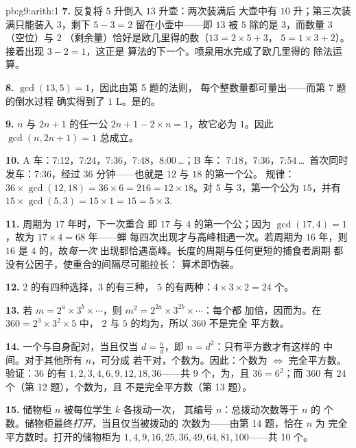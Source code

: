 \begin{solution}{pb:g9:arith:1}
\textbf{7.} 反复将 $5$ 升倒入 $13$ 升壶：两次装满后
大壶中有 $10$ 升；第三次装满只能装入
$3$，剩下 $5 - 3 = 2$ 留在小壶中——即
$13$ 被 $5$ 除的是 $3$，而数量 $3$（空位）与 $2$
（剩余量）恰好是欧几里得的数（$13 = 2 \times 5 + 3$，
$5 = 1 \times 3 + 2$）。接着出现 $3 - 2 = 1$，这正是
算法的下一个。喷泉用水完成了欧几里得的
除法运算。

\textbf{8.} $\gcd(13, 5) = 1$，因此由第 5 题的法则，
每个整数量都可量出——而第 7 题的倒水过程
确实得到了 $1$ L。是的。

\textbf{9.} $n$ 与 $2n + 1$ 的任一公
$2n + 1 - 2 \times n = 1$，故它必为 $1$。因此
$\gcd(n, 2n+1) = 1$ 总成立。

\textbf{10.} A 车：7:12，7:24，7:36，7:48，8:00\,\dots；B 车：
7:18，7:36，7:54\,\dots\ 首次同时发车：7:36，经过
$36$ 分钟——也就是 $12$ 与 $18$ 的第一个公。
规律：$36 \times \gcd(12, 18) = 36 \times 6 = 216 = 12 \times
18$。对 $5$ 与 $3$，第一个公为 $15$，并有
$15 \times \gcd(5,3) = 15 \times 1 = 15 = 5 \times 3$.

\textbf{11.} 周期为 $17$ 年时，下一次重合
即 $17$ 与 $4$ 的第一个公；因为
$\gcd(17, 4) = 1$，故为 $17 \times 4 = 68$ 年——蝉
每四次出现才与高峰相遇一次。若周期为
$16$ 年，则 $16$ 是 $4$ 的，故\emph{每一次}
出现都恰遇高峰。长度的周期与任何更短的捕食者周期
都没有公因子，使重合的间隔尽可能拉长：
算术即伪装。

\textbf{12.} $2$ 的有四种选择，$3$ 的有三种，
$5$ 的有两种：$4 \times 3 \times 2 = 24$ 个。

\textbf{13.} 若 $m = 2^{a} \times 3^{b} \times \cdots$，则
$m^2 = 2^{2a} \times 3^{2b} \times \cdots$：每个都
加倍，因而为。在 $360 = 2^3 \times 3^2 \times 5$ 中，
$2$ 与 $5$ 的均为，所以 $360$ 不是完全
平方数。

\textbf{14.} 一个与自身配对，当且仅当
$d = \frac nd$，即 $n = d^2$：只有平方数才有这样的
中间。对于其他所有 $n$，可分成
若干对，个数为。因此：个数为
$\Leftrightarrow$ 完全平方数。验证：$36$ 的有
$1, 2, 3, 4, 6, 9, 12, 18, 36$——共 9 个，为，且
$36 = 6^2$；而 $360$ 有 $24$ 个（第 12 题），个数为，且
不是完全平方数（第 13 题）。

\textbf{15.} 储物柜 $n$ 被每位学生 $k$ 各拨动一次，
其编号 $n$：总拨动次数等于 $n$ 的
个数。储物柜最终\emph{打开}，当且仅当被拨动的
次数为——由第 14 题，恰在 $n$ 为
完全平方数时。打开的储物柜为 $1, 4, 9, 16, 25, 36, 49, 64,
81, 100$——共 10 个。
\end{solution}
